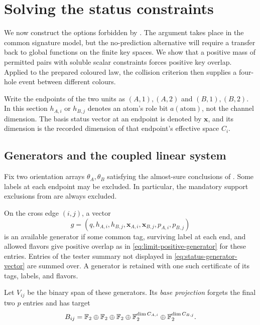 \section{Solving the status constraints}
\label{sec:status-span}

We now construct the options forbidden by .
The argument takes place in the common signature model, but the
no-prediction alternative will require a transfer back to global
functions on the finite key spaces.
We show that a positive mass of permitted pairs with soluble scalar
constraints forces positive key overlap. Applied to the prepared
coloured law, the collision criterion then supplies a four-hole event
between different colours.

Write the endpoints of the two units as $(A,1),(A,2)$ and
$(B,1),(B,2)$. In this section $h_{A,i}$ or $h_{B,j}$ denotes an atom's
role bit $a(\mathrm{atom})$, not the channel dimension. The basis status
vector at an endpoint is denoted by $\mathbf x$, and its dimension is
the recorded dimension of that endpoint's effective space $C_i$.

\subsection{Generators and the coupled linear system}

Fix two orientation arrays $\theta_A,\theta_B$ satisfying the
almost-sure conclusions of . Some labels at each
endpoint may be excluded. In particular, the mandatory support
exclusions from  are always excluded.

\begin{definition}
\label{def:status-generator}
On the cross edge $(i,j)$, a vector
\begin{equation}
\label{eq:status-generator-vector}
g=(q,h_{A,i},h_{B,j},\mathbf x_{A,i},\mathbf x_{B,j},p_{A,i},p_{B,j})
\end{equation}
is an available generator if some common tag, surviving label at each
end, and allowed flavors give positive overlap as in
\eqref{eq:limit-positive-generator} for these entries. Entries of the
tester summary not displayed in \eqref{eq:status-generator-vector}
are summed over. A generator is retained with one such certificate of
its tags, labels, and flavors.

Let $V_{ij}$ be the binary span of these generators. Its \emph{base
projection} forgets the final two $p$ entries and has target
\[
B_{ij}=\mathbb F_2\oplus\mathbb F_2\oplus\mathbb F_2\oplus
             \mathbb F_2^{\dim C_{A,i}}\oplus\mathbb F_2^{\dim C_{B,j}}.
\]
\end{definition}

